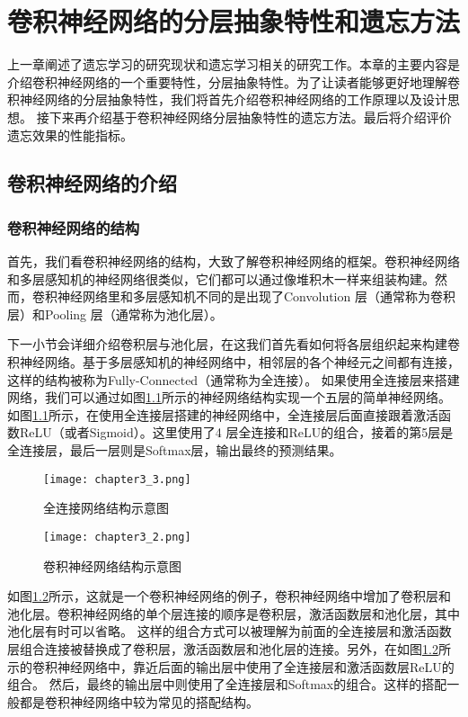 
\chapter{卷积神经网络的分层抽象特性和遗忘方法}
上一章阐述了遗忘学习的研究现状和遗忘学习相关的研究工作。本章的主要内容是介绍卷积神经网络的一个重要特性，分层抽象特性。为了让读者能够更好地理解卷积神经网络的分层抽象特性，我们将首先介绍卷积神经网络的工作原理以及设计思想。
接下来再介绍基于卷积神经网络分层抽象特性的遗忘方法。最后将介绍评价遗忘效果的性能指标。

\section{卷积神经网络的介绍}

\subsection{卷积神经网络的结构}

首先，我们看卷积神经网络的结构，大致了解卷积神经网络的框架。卷积神经网络和多层感知机的神经网络很类似，它们都可以通过像堆积木一样来组装构建。然而，卷积神经网络里和多层感知机不同的是出现了Convolution 层（通常称为卷积层）和Pooling 层（通常称为池化层）。

下一小节会详细介绍卷积层与池化层，在这我们首先看如何将各层组织起来构建卷积神经网络。基于多层感知机的神经网络中，相邻层的各个神经元之间都有连接，这样的结构被称为Fully-Connected（通常称为全连接）。
如果使用全连接层来搭建网络，我们可以通过如图\ref{fig:chapter3_3}所示的神经网络结构实现一个五层的简单神经网络。
如图\ref{fig:chapter3_3}所示，在使用全连接层搭建的神经网络中，全连接层后面直接跟着激活函数ReLU（或者Sigmoid）。这里使用了4 层全连接和ReLU的组合，接着的第5层是全连接层，最后一层则是Softmax层，输出最终的预测结果。
\begin{figure}
    \centering
    \texttt{[image: chapter3\_3.png]}
    \caption{全连接网络结构示意图\cite{luyujie_216}}
    \label{fig:chapter3_3}
\end{figure}
\begin{figure}
    \centering
    \texttt{[image: chapter3\_2.png]}
    \caption{卷积神经网络结构示意图\cite{luyujie_216}}
    \label{fig:chapter3_2}
\end{figure}

如图\ref{fig:chapter3_2}所示，这就是一个卷积神经网络的例子，卷积神经网络中增加了卷积层和池化层。卷积神经网络的单个层连接的顺序是卷积层，激活函数层和池化层，其中池化层有时可以省略。
这样的组合方式可以被理解为前面的全连接层和激活函数层组合连接被替换成了卷积层，激活函数层和池化层的连接。另外，在如图\ref{fig:chapter3_2}所示的卷积神经网络中，靠近后面的输出层中使用了全连接层和激活函数层ReLU的组合。
然后，最终的输出层中则使用了全连接层和Softmax的组合。这样的搭配一般都是卷积神经网络中较为常见的搭配结构。


